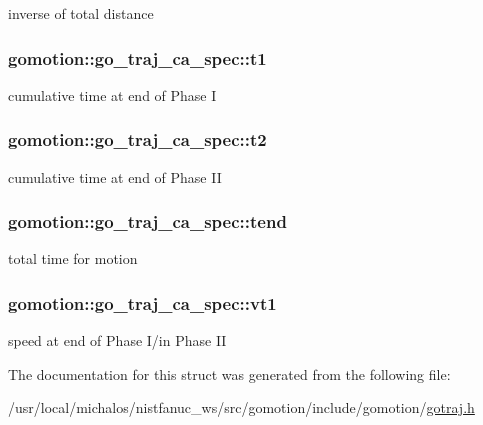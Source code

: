 inverse of total distance 

\hypertarget{structgomotion_1_1go__traj__ca__spec_a74e2a14901fa22a22255c7ed0d9df84b}{
\subsubsection[{t1}]{ gomotion\-::go\-\_\-traj\-\_\-ca\-\_\-spec\-::t1}}\label{structgomotion_1_1go__traj__ca__spec_a74e2a14901fa22a22255c7ed0d9df84b}


cumulative time at end of Phase I 

\hypertarget{structgomotion_1_1go__traj__ca__spec_ab45dbf63d9deeb63abddf7da84154bc1}{
\subsubsection[{t2}]{ gomotion\-::go\-\_\-traj\-\_\-ca\-\_\-spec\-::t2}}\label{structgomotion_1_1go__traj__ca__spec_ab45dbf63d9deeb63abddf7da84154bc1}


cumulative time at end of Phase I\-I 

\hypertarget{structgomotion_1_1go__traj__ca__spec_abcb5b78e929e0b33d940518032271d04}{
\subsubsection[{tend}]{ gomotion\-::go\-\_\-traj\-\_\-ca\-\_\-spec\-::tend}}\label{structgomotion_1_1go__traj__ca__spec_abcb5b78e929e0b33d940518032271d04}


total time for motion 

\hypertarget{structgomotion_1_1go__traj__ca__spec_ac455589252cf4d99759d09fb00a5eb35}{
\subsubsection[{vt1}]{ gomotion\-::go\-\_\-traj\-\_\-ca\-\_\-spec\-::vt1}}\label{structgomotion_1_1go__traj__ca__spec_ac455589252cf4d99759d09fb00a5eb35}


speed at end of Phase I/in Phase I\-I 



The documentation for this struct was generated from the following file\-:\begin{DoxyCompactItemize}
\item 
/usr/local/michalos/nistfanuc\-\_\-ws/src/gomotion/include/gomotion/\hyperlink{gotraj_8h}{gotraj.\-h}\end{DoxyCompactItemize}
